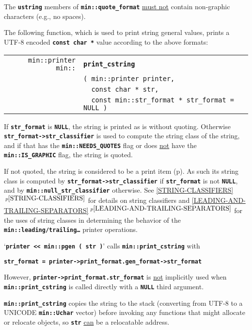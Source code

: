 \documentclass[12pt]{article}
\makeatletter
\newcommand{\TT}[1]{{\tt \bfseries #1}}
\newcommand{\ttindex}[1]{\index{#1@{\tt #1}}}
\newcommand{\itemref}[1]{\ref{#1}$\,^{p\pageref{#1}}$}
\newcommand{\pagref}[1]{p\pageref{#1}}
\newcommand{\EOL}{\penalty \exhyphenpenalty}
\newenvironment{indpar}[1][0.3in]%
	{\begin{list}{}%
		     {\setlength{\itemsep}{0in}%
		      \setlength{\topsep}{0in}%
		      \setlength{\parsep}{1ex}%
		      \setlength{\labelwidth}{#1}%
		      \setlength{\leftmargin}{#1}%
		      \addtolength{\leftmargin}{\labelsep}}%
	 \item}%
	{\end{list}}
\newcommand{\LABEL}[1]{\label{#1}}
\newlength{\ARGBREAKLENGTH}
\newcommand{\ARGBREAK}[1][\ARGBREAKLENGTH]{\\&\hspace*{#1}}
\newcommand{\MINKEY}[1]%
	   {\TT{#1}\ttindex{min::#1}\ttindex{#1}}
\makeatother
\begin{document}
The \TT{ustring} members of \TT{min::quote\_format} \underline{must not}
contain non-graphic characters (e.g., no spaces).

The following function, which is used to print string general values,
prints a UTF-8 encoded \TT{const char *}
value according to the above formats:

\begin{indpar}[1em]\begin{tabular}{r@{}l}
\verb|min::printer min::| & \MINKEY{print\_cstring}\ARGBREAK
    \verb|( min::printer printer,|\ARGBREAK
    \verb|  const char * str,|\ARGBREAK
    \verb|  const min::str_format * str_format = NULL )|
\LABEL{MIN::PRINT_CSTRING} \\
\end{tabular}\end{indpar}

If \TT{str\_\EOL format} is \TT{NULL},
the string is printed as is without quoting.
Otherwise \TT{str\_\EOL format->\EOL str\_\EOL classifier}
is used to compute the
string class of the string, and if that has the
\TT{min::\EOL NEEDS\_\EOL QUOTES} flag or does \underline{not} have the
\TT{min::\EOL IS\_\EOL GRAPHIC} flag, the string is quoted.

If not quoted, the string
is considered to be a print item (\pagref{PRINT-ITEM}).
As such its string class is computed by
\TT{str\_\EOL format->\EOL str\_\EOL classifier} if \TT{str\_\EOL format}
is not \TT{NULL}, and by \TT{min::\EOL null\_\EOL str\_\EOL classifier}
otherwise.
See \itemref{STRING-CLASSIFIERS} for details on string classifiers
and \itemref{LEADING-AND-TRAILING-SEPARATORS} for the uses of string
classes in determining the behavior of the
\TT{min::\EOL leading/\EOL trailing\ldots} printer operations.

`\TT{printer <{}< min::pgen ( str )}' calls \TT{min::\EOL print\_\EOL cstring}
with
\begin{center}
\TT{str\_format = printer->print\_format.gen\_format->str\_format}
\end{center}
However,
\TT{printer->\EOL print\_\EOL format.str\_\EOL format} is \underline{not}
implicitly used when \TT{min::\EOL print\_\EOL cstring} is called directly
with a \TT{NULL} third argument.

\TT{min::print\_cstring} copies the string to the stack (converting from
UTF-8 to a UNICODE \TT{min::\EOL Uchar} vector) before invoking
any functions that might allocate or relocate objects, so \TT{str}
\underline{can} be a relocatable address.
\end{document}
